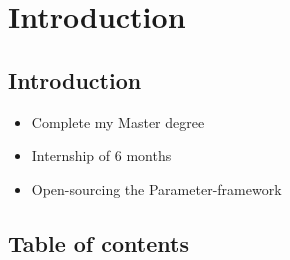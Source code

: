%
%

\section{Introduction}

\subsection{Introduction}
\begin{FrameWithSubSection}
    \begin{itemize}
        \item Complete my Master degree
        \item Internship of 6 months
        \item Open-sourcing the Parameter-framework
    \end{itemize}
\end{FrameWithSubSection}

\subsection{Table of contents}
